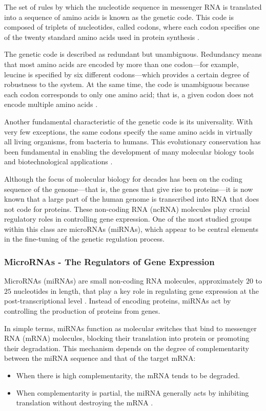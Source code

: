 The set of rules by which the nucleotide sequence in messenger RNA is translated into a sequence of amino acids is known as 
the genetic code. This code is composed of triplets of nucleotides, called codons, where each codon specifies one of the twenty 
standard amino acids used in protein synthesis \cite{genetic_codeNovozhilov2008O}.

The genetic code is described as redundant but unambiguous. Redundancy means that most amino acids are encoded by more than 
one codon—for example, leucine is specified by six different codons—which provides a certain degree of robustness to the system. 
At the same time, the code is unambiguous because each codon corresponds to only one amino acid; that is, a given codon does not 
encode multiple amino acids \cite{ConceptsBiology_DNA}.

Another fundamental characteristic of the genetic code is its universality. With very few exceptions, the same codons specify the 
same amino acids in virtually all living organisms, from bacteria to humans. This evolutionary conservation has been fundamental in 
enabling the development of many molecular biology tools and biotechnological applications \cite{genetic_codeKoonin2017}.

Although the focus of molecular biology for decades has been on the coding sequence of the genome—that is, the genes that give rise 
to proteins—it is now known that a large part of the human genome is transcribed into RNA that does not code for proteins. 
These non-coding RNA (ncRNA) molecules play crucial regulatory roles in controlling gene expression. One of the most studied groups 
within this class are microRNAs (miRNAs), which appear to be central elements in the fine-tuning of the genetic regulation process.

\subsubsection*{MicroRNAs - The Regulators of Gene Expression}
MicroRNAs (miRNAs) are small non-coding RNA molecules, approximately $20$ to $25$ nucleotides in length, that play a key 
role in regulating gene expression at the post-transcriptional level \cite{regulatory_mecha_mirnaGulyaeva2016, first_mirna_Ambros1993,post_transcript_wightman1993}. 
Instead of encoding proteins, miRNAs act by controlling the production of proteins from genes.

In simple terms, miRNAs function as molecular switches that bind to messenger RNA (mRNA) molecules, blocking their 
translation into protein or promoting their degradation. This mechanism depends on the degree of complementarity 
between the miRNA sequence and that of the target mRNA:
\begin{itemize}
    \item When there is high complementarity, the mRNA tends to be degraded.
    \item When complementarity is partial, the miRNA generally acts by inhibiting translation without destroying the mRNA \cite{role_mirna_Calaf2023}.
\end{itemize}

